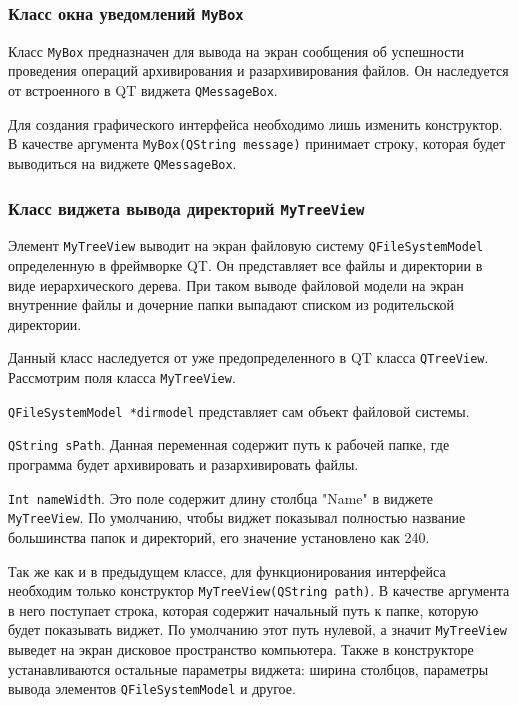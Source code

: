 \subsubsection{Класс окна уведомлений \texttt{MyBox}}

Класс \texttt{MyBox} предназначен для вывода на экран сообщения об успешности проведения операций архивирования и разархивирования файлов.
Он наследуется от встроенного в QT виджета \texttt{QMessageBox}.



Для создания графического интерфейса необходимо лишь изменить конструктор.
В качестве аргумента \texttt{MyBox(QString message)} принимает строку, которая будет выводиться на виджете \texttt{QMessageBox}.



\subsubsection{Класс виджета вывода директорий \texttt{MyTreeView}}

Элемент \texttt{MyTreeView} выводит на экран файловую систему \texttt{QFileSystemModel} определенную в фреймворке QT.
Он представляет все файлы и директории в виде иерархического дерева.
При таком выводе файловой модели на экран внутренние файлы и дочерние папки выпадают списком из родительской директории.



Данный класс наследуется от уже предопределенного в QT класса \texttt{QTreeView}.
Рассмотрим поля класса \texttt{MyTreeView}.



\texttt{QFileSystemModel *dirmodel} представляет сам объект файловой системы.



\texttt{QString sPath}. 
Данная переменная содержит путь к рабочей папке, где программа будет архивировать и разархивировать файлы.



\texttt{Int nameWidth}.
Это поле содержит длину столбца "Name" в виджете \texttt{MyTreeView}.
По умолчанию, чтобы виджет показывал полностью название большинства папок и директорий, его значение установлено как 240.



Так же как и в предыдущем классе, для функционирования интерфейса необходим только конструктор \texttt{MyTreeView(QString path)}.
В качестве аргумента в него поступает строка, которая содержит начальный путь к папке, которую будет показывать виджет.
По умолчанию этот путь нулевой, а значит \texttt{MyTreeView} выведет на экран дисковое пространство компьютера.
Также в конструкторе устанавливаются остальные параметры виджета: ширина столбцов, параметры вывода элементов \texttt{QFileSystemModel} и другое.



